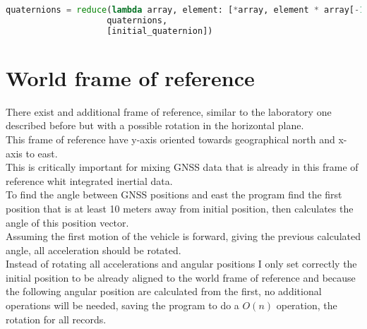 \begin{lstlisting}[language=Python,frame=single,float,floatplacement=H]
quaternions = reduce(lambda array, element: [*array, element * array[-1]], 
					quaternions, 
					[initial_quaternion])
\end{lstlisting}


\section{World frame of reference}
There exist and additional frame of reference, similar to the laboratory one described before but with a possible rotation in the horizontal plane. \\
This frame of reference have y-axis oriented towards geographical north and x-axis to east. \\
This is critically important for mixing GNSS data that is already in this frame of reference whit integrated inertial data. \\
To find the angle between GNSS positions and east the program find the first position that is at least 10 meters away from initial position, then calculates the angle of this position vector. \\
Assuming the first motion of the vehicle is forward, giving the previous calculated angle, all acceleration should be rotated. \\
Instead of rotating all accelerations and angular positions I only set correctly the initial position to be already aligned to the world frame of reference and because the following angular position are calculated from the first, no additional operations will be needed, saving the program to do a $O(n)$ operation, the rotation for all records.